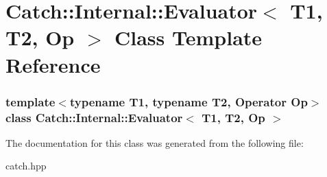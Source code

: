 \hypertarget{classCatch_1_1Internal_1_1Evaluator}{
\section{Catch::Internal::Evaluator$<$ T1, T2, Op $>$ Class Template Reference}
\label{classCatch_1_1Internal_1_1Evaluator}
}
\subsubsection*{template$<$typename T1, typename T2, Operator Op$>$ class Catch::Internal::Evaluator$<$ T1, T2, Op $>$}



The documentation for this class was generated from the following file:\begin{DoxyCompactItemize}
\item 
catch.hpp\end{DoxyCompactItemize}
